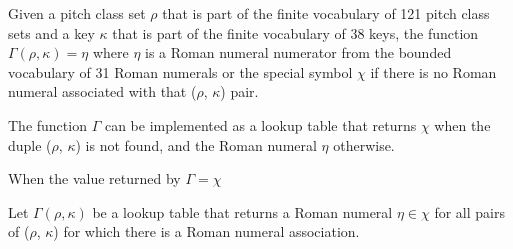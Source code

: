 
Given a pitch class set $\rho$ that is part of the finite
vocabulary of 121 pitch class sets and a key $\kappa$ that
is part of the finite vocabulary of 38 keys, the function
$\Gamma(\rho, \kappa) = \eta$ where $\eta$ is a Roman
numeral numerator from the bounded vocabulary of 31 Roman
numerals or the special symbol $\chi$ if there is no Roman
numeral associated with that ($\rho$, $\kappa$) pair.

The function $\Gamma$ can be implemented as a lookup table
that returns $\chi$ when the duple ($\rho$, $\kappa$) is not
found, and the Roman numeral $\eta$ otherwise.

When the value returned by $\Gamma = \chi$

Let $\Gamma(\rho, \kappa)$ be a lookup table that returns a
Roman numeral $\eta \in \chi$ for all pairs of ($\rho$,
$\kappa$) for which there is a Roman numeral association. 
